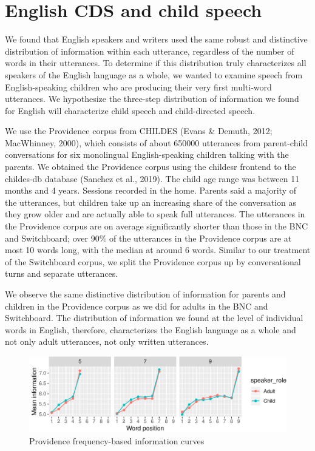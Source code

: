 \documentclass[11pt,]{article}
\begin{document}
\hypertarget{english-cds-and-child-speech}{%
\section{English CDS and child speech}\label{english-cds-and-child-speech}}

We found that English speakers and writers used the same robust and distinctive distribution of information within each utterance, regardless of the number of words in their utterances. To determine if this distribution truly characterizes all speakers of the English language as a whole, we wanted to examine speech from English-speaking children who are producing their very first multi-word utterances. We hypothesize the three-step distribution of information we found for English will characterize child speech and child-directed speech.

We use the Providence corpus from CHILDES (Evans \& Demuth, 2012; MacWhinney, 2000), which consists of about 650000 utterances from parent-child conversations for six monolingual English-speaking children talking with the parents. We obtained the Providence corpus using the childesr frontend to the childes-db database (Sanchez et al., 2019). The child age range was between 11 months and 4 years. Sessions recorded in the home. Parents said a majority of the utterances, but children take up an increasing share of the conversation as they grow older and are actually able to speak full utterances. The utterances in the Providence corpus are on average significantly shorter than those in the BNC and Switchboard; over 90\% of the utterances in the Providence corpus are at most 10 words long, with the median at around 6 words. Similar to our treatment of the Switchboard corpus, we split the Providence corpus up by conversational turns and separate utterances.

We observe the same distinctive distribution of information for parents and children in the Providence corpus as we did for adults in the BNC and Switchboard. The distribution of information we found at the level of individual words in English, therefore, characterizes the English language as a whole and not only adult utterances, not only written utterances.

\begin{figure}
\centering
\includegraphics{paper_files/figure-latex/unnamed-chunk-1-1.pdf}
\caption{\label{fig:unnamed-chunk-1}Providence frequency-based information curves}
\end{figure}
\end{document}
